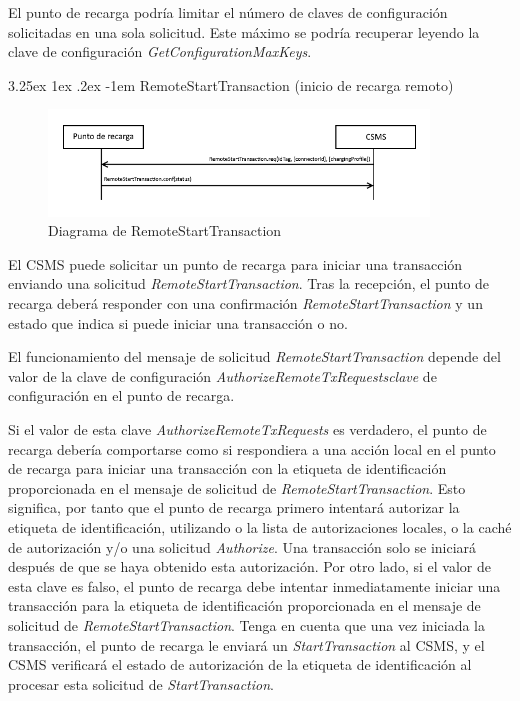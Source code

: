 \documentclass[12pt,a4paper,onecolumn,oneside]{report}
\makeatletter
\renewcommand\paragraph{\@startsection{paragraph}{5}{\z@}%
  {3.25ex \@plus1ex \@minus.2ex}%
  {-1em}%
  {\normalfont\normalsize\bfseries}}
\makeatother
\begin{document}
El punto de recarga podría limitar el número de claves de configuración solicitadas en una sola solicitud. Este máximo se podría recuperar leyendo la clave de configuración \textit{GetConfigurationMaxKeys}.


\paragraph{RemoteStartTransaction (inicio de recarga remoto)}
\label{RemoteStartTransaction (inicio de recarga remoto)}


\begin{figure}[H] 
\centering
  \includegraphics[width=0.9\textwidth]{figuras/diagramaremotestarttransaction.png}
  \caption[Diagrama de \textit{RemoteStartTransaction}]{Diagrama de RemoteStartTransaction\\
  }
  \label{fig:diagramaremotestarttransaction}
\end{figure}



El CSMS puede solicitar un punto de recarga para iniciar una transacción enviando una solicitud \textit{RemoteStartTransaction}. Tras la recepción, el punto de recarga deberá responder con una confirmación \textit{RemoteStartTransaction} y un estado que indica si puede iniciar una transacción o no.

El funcionamiento del mensaje de solicitud \textit{RemoteStartTransaction} depende del valor de la clave de configuración \textit{AuthorizeRemoteTxRequestsclave} de configuración en el punto de recarga.

Si el valor de esta clave \textit{AuthorizeRemoteTxRequests} es verdadero, el punto de recarga debería comportarse como si respondiera a una acción local en el punto de recarga para iniciar una transacción con la etiqueta de identificación proporcionada en el mensaje de solicitud de \textit{RemoteStartTransaction}. Esto significa, por tanto que el punto de recarga primero intentará autorizar la etiqueta de identificación, utilizando o la lista de autorizaciones locales, o la caché de autorización y/o una solicitud \textit{Authorize}. Una transacción solo se iniciará después de que se haya obtenido esta autorización. Por otro lado, si el valor de esta clave es falso, el punto de recarga debe intentar inmediatamente iniciar una transacción para la etiqueta de identificación proporcionada en el mensaje de solicitud de \textit{RemoteStartTransaction}. Tenga en cuenta que una vez iniciada la transacción, el punto de recarga le enviará un \textit{StartTransaction} al CSMS, y el CSMS verificará el estado de autorización de la etiqueta de identificación al procesar esta solicitud de \textit{StartTransaction}.
\end{document}
